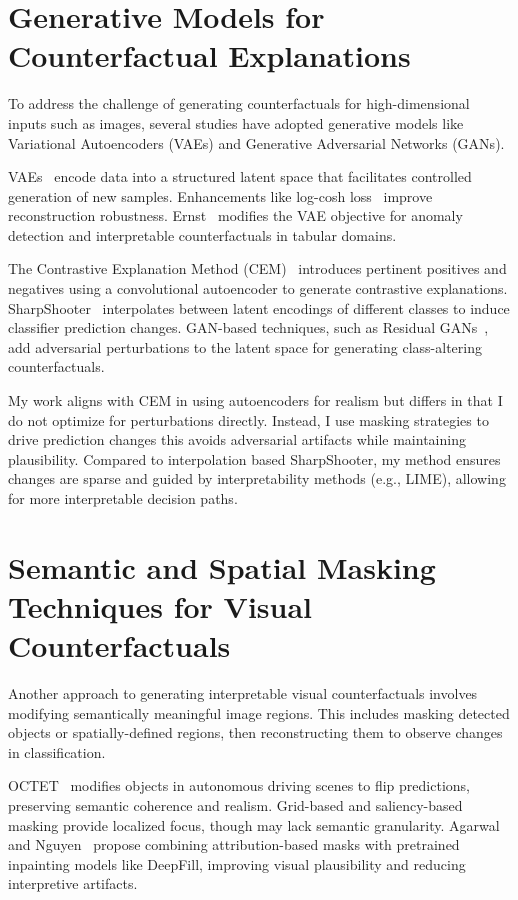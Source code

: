 \section{Generative Models for Counterfactual Explanations}

To address the challenge of generating counterfactuals for high-dimensional inputs such as images, several studies have adopted generative models like Variational Autoencoders (VAEs) and Generative Adversarial Networks (GANs).

VAEs~\cite{Kingma_2019} encode data into a structured latent space that facilitates controlled generation of new samples. Enhancements like log-cosh loss~\cite{chen2019log} improve reconstruction robustness. Ernst~\cite{ernst2024counterfactual} modifies the VAE objective for anomaly detection and interpretable counterfactuals in tabular domains.

The Contrastive Explanation Method (CEM)~\cite{DBLP:journals/corr/abs-1802-07623} introduces pertinent positives and negatives using a convolutional autoencoder to generate contrastive explanations. SharpShooter~\cite{barr2021counterfactualexplanationslatentspace} interpolates between latent encodings of different classes to induce classifier prediction changes. GAN-based techniques, such as Residual GANs~\cite{nemirovsky2021countergangeneratingrealisticcounterfactuals}, add adversarial perturbations to the latent space for generating class-altering counterfactuals.

My work aligns with CEM in using autoencoders for realism but differs in that I do not optimize for perturbations directly. Instead, I use masking strategies to drive prediction changes this avoids adversarial artifacts while maintaining plausibility. Compared to interpolation based SharpShooter, my method ensures changes are sparse and guided by interpretability methods (e.g., LIME), allowing for more interpretable decision paths.


\section{Semantic and Spatial Masking Techniques for Visual Counterfactuals}
Another approach to generating interpretable visual counterfactuals involves modifying semantically meaningful image regions. This includes masking detected objects or spatially-defined regions, then reconstructing them to observe changes in classification.

OCTET~\cite{zemni2023octetobjectawarecounterfactualexplanations} modifies objects in autonomous driving scenes to flip predictions, preserving semantic coherence and realism. Grid-based and saliency-based masking provide localized focus, though may lack semantic granularity. Agarwal and Nguyen~\cite{agarwal2020explainingimageclassifiersremoving} propose combining attribution-based masks with pretrained inpainting models like DeepFill, improving visual plausibility and reducing interpretive artifacts.

